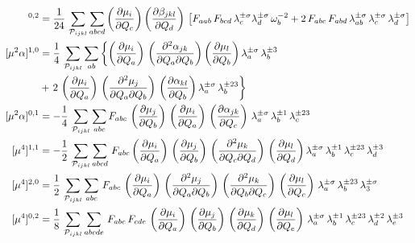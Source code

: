 \documentclass[12pt,a4paper]{article}
\begin{document}
\begin{align}
[\mu\beta]^{0,2} &= \frac{1}{24}\,\sum_{\mathcal{P}_{ijkl}} \sum_{abcd} \tdiff{\mu_i}{Q_c}\tdiff{\beta_{jkl}}{Q_d}\,\left[F_{aab}\,F_{bcd}\,\lb{\sigma}{c}\lb{\sigma}{d}\,\omega_b^{-2}+2\,F_{abc}\,F_{abd}\,\lb{\sigma}{ab}\,\lb{\sigma}{c}\,\lb{\sigma}{d}\right]\\
%
[\mu^2\alpha]^{1,0} &= \frac{1}{4}\,\sum_{\mathcal{P}_{ijkl}} \sum_{ab} \left\{\tdiff{\mu_i}{Q_a}\,\tdiff{^2\alpha_{jk}}{Q_a\partial Q_b}\tdiff{\mu_l}{Q_b}\lb{\sigma}{a}\,\lb{3}{b}\right.\nonumber\\
&+\left.2\,\tdiff{\mu_i}{Q_a}\,\tdiff{^2\mu_j}{Q_a\partial Q_b}\,\tdiff{\alpha_{kl}}{Q_b}\lb{\sigma}{a}\,\lb{23}{b}\right\}
\\
[\mu^2\alpha]^{0,1} &= -\frac{1}{4}\,\sum_{\mathcal{P}_{ijkl}} \sum_{abc} F_{abc}\,\tdiff{\mu_j}{Q_b}\,\tdiff{\mu_i}{Q_a}\,\tdiff{\alpha_{jk}}{Q_c}\,\lb{\sigma}{a}\,\lb{1}{b}\,\lb{23}{c} \\
%
[\mu^4]^{1,1} &= -\frac{1}{2}\,\sum_{\mathcal{P}_{ijkl}} \sum_{abcd}\,F_{abc}
\tdiff{\mu_i}{Q_a}\,\tdiff{\mu_j}{Q_b}\,\tdiff{^2\mu_k}{Q_c\partial Q_d}\,\tdiff{\mu_l}{Q_d}
\lb{\sigma}{a}\,\lb{1}{b}\,\lb{23}{c}\,\lb{3}{d}\\
[\mu^4]^{2,0} &= \frac{1}{2}\,\sum_{\mathcal{P}_{ijkl}} \sum_{abc}\,F_{abc}\,\tdiff{\mu_i}{Q_a}\, \tdiff{^2\mu_j}{Q_a\partial Q_b}\, \tdiff{^2\mu_k}{Q_b\partial Q_c}\,\tdiff{\mu_l}{Q_c}\,\lb{\sigma}{a}\,\lb{23}{b}\,\lb{\sigma}{3}\\
[\mu^4]^{0,2} &= \frac{1}{8}\,\sum_{\mathcal{P}_{ijkl}} \sum_{abcde}\,F_{abc}\,F_{cde}\,\tdiff{\mu_i}{Q_a}\, \tdiff{\mu_j}{Q_b}\, \tdiff{\mu_k}{Q_d}\,\tdiff{\mu_l}{Q_e}\,\lb{\sigma}{a}\,\lb{1}{b}\,\lb{23}{c}\,\lb{2}{d}\,\lb{3}{e}
\end{align}



\end{document}
